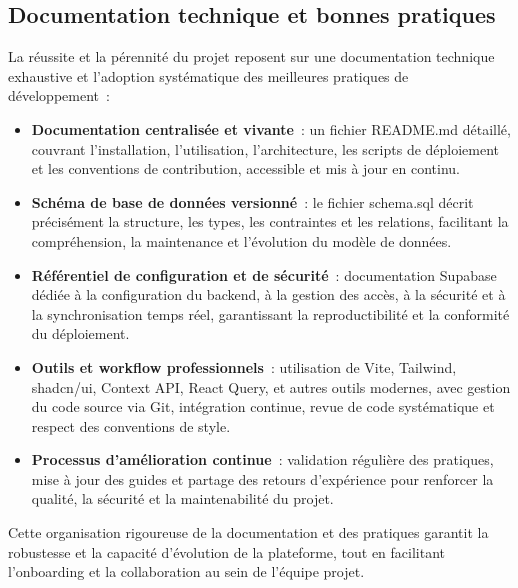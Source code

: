 \documentclass[a4paper,11pt]{report}
\begin{document}
\subsection{Documentation technique et bonnes pratiques}
La réussite et la pérennité du projet reposent sur une documentation technique exhaustive et l'adoption systématique des meilleures pratiques de développement :
\begin{itemize}
    \item \textbf{Documentation centralisée et vivante} : un fichier README.md détaillé, couvrant l'installation, l'utilisation, l'architecture, les scripts de déploiement et les conventions de contribution, accessible et mis à jour en continu.
    \item \textbf{Schéma de base de données versionné} : le fichier schema.sql décrit précisément la structure, les types, les contraintes et les relations, facilitant la compréhension, la maintenance et l'évolution du modèle de données.
    \item \textbf{Référentiel de configuration et de sécurité} : documentation Supabase dédiée à la configuration du backend, à la gestion des accès, à la sécurité et à la synchronisation temps réel, garantissant la reproductibilité et la conformité du déploiement.
    \item \textbf{Outils et workflow professionnels} : utilisation de Vite, Tailwind, shadcn/ui, Context API, React Query, et autres outils modernes, avec gestion du code source via Git, intégration continue, revue de code systématique et respect des conventions de style.
    \item \textbf{Processus d'amélioration continue} : validation régulière des pratiques, mise à jour des guides et partage des retours d'expérience pour renforcer la qualité, la sécurité et la maintenabilité du projet.
\end{itemize}
Cette organisation rigoureuse de la documentation et des pratiques garantit la robustesse et la capacité d'évolution de la plateforme, tout en facilitant l'onboarding et la collaboration au sein de l'équipe projet.
\end{document}
